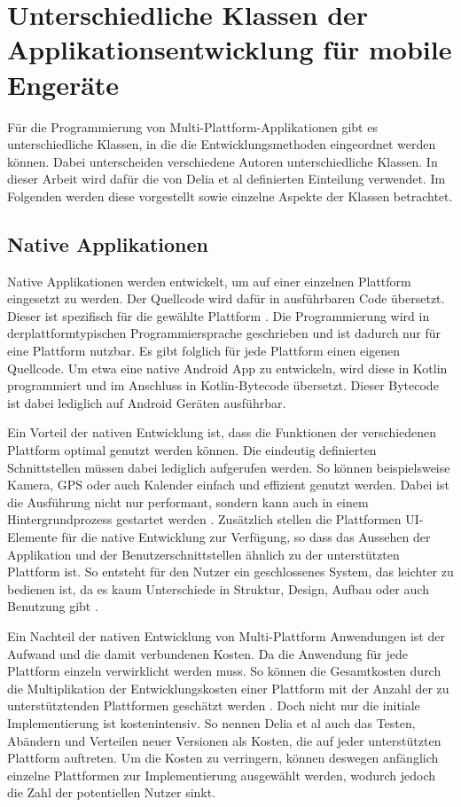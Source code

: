 \section{Unterschiedliche Klassen der Applikationsentwicklung für mobile Engeräte}
Für die Programmierung von Multi-Plattform-Applikationen gibt es unterschiedliche Klassen, in die die Entwicklungsmethoden eingeordnet werden können. Dabei unterscheiden verschiedene Autoren unterschiedliche Klassen. In dieser Arbeit wird dafür die von Delia et al \cite{IEEE_development_classes} definierten Einteilung verwendet. Im Folgenden werden diese vorgestellt sowie einzelne Aspekte der Klassen betrachtet.

\subsection{Native Applikationen}
Native Applikationen werden entwickelt, um auf einer einzelnen Plattform eingesetzt zu werden. Der Quellcode wird dafür in ausführbaren Code übersetzt. Dieser ist spezifisch für die gewählte Plattform \cite{IEEE_development_classes}.
Die Programmierung wird in derplattformtypischen Programmiersprache geschrieben und ist dadurch nur für eine Plattform nutzbar. Es gibt folglich für jede Plattform einen eigenen Quellcode. Um etwa eine native Android App zu entwickeln, wird diese in Kotlin programmiert und im Anschluss in Kotlin-Bytecode übersetzt. Dieser Bytecode ist dabei lediglich auf Android Geräten ausführbar.

Ein Vorteil der nativen Entwicklung ist, dass die Funktionen der verschiedenen Plattform optimal genutzt werden können. Die eindeutig definierten Schnittstellen müssen dabei lediglich aufgerufen werden. So können beispielsweise Kamera, GPS oder auch Kalender einfach und effizient genutzt werden. Dabei ist die Ausführung nicht nur performant, sondern kann auch in einem Hintergrundprozess gestartet werden \cite{IEEE_development_classes}.
Zusätzlich stellen die Plattformen UI-Elemente für die native Entwicklung zur Verfügung, so dass das Aussehen der Applikation und der Benutzerschnittstellen ähnlich zu der unterstützten Plattform ist. So entsteht für den Nutzer ein geschlossenes System, das leichter zu bedienen ist, da es kaum Unterschiede in Struktur, Design, Aufbau oder auch Benutzung gibt \cite{IEEE_Khackouch_Al}.

Ein Nachteil der nativen Entwicklung von Multi-Plattform Anwendungen ist der Aufwand und die damit verbundenen Kosten. Da die Anwendung für jede Plattform einzeln verwirklicht werden muss. So können die Gesamtkosten durch die Multiplikation der Entwicklungskosten einer Plattform mit der Anzahl der zu unterstütztenden Plattformen geschätzt werden \cite{IEEE_Khackouch_Al}. Doch nicht nur die initiale Implementierung ist kostenintensiv. So nennen Delia et al \cite{IEEE_development_classes} auch das Testen, Abändern und Verteilen neuer Versionen als Kosten, die auf jeder unterstützten Plattform auftreten. 
Um die Kosten zu verringern, können deswegen anfänglich einzelne Plattformen zur Implementierung ausgewählt werden, wodurch jedoch die Zahl der potentiellen Nutzer sinkt.

